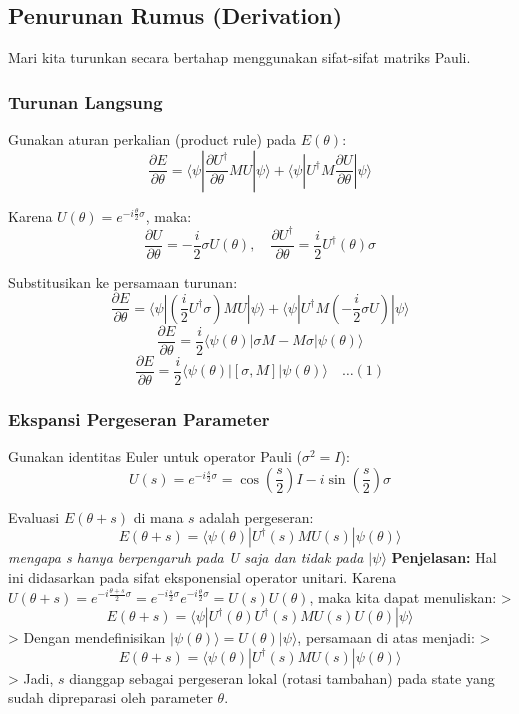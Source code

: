 \hypertarget{penurunan-rumus-derivation}{%
\subsection{Penurunan Rumus (Derivation)}\label{penurunan-rumus-derivation}}

Mari kita turunkan secara bertahap menggunakan sifat-sifat matriks Pauli.

\hypertarget{a.-turunan-langsung}{%
\subsubsection{Turunan Langsung}\label{a.-turunan-langsung}}

Gunakan aturan perkalian (product rule) pada \(E(\theta)\): \[\frac{\partial E}{\partial \theta} = \langle \psi | \frac{\partial U^\dagger}{\partial \theta} M U | \psi \rangle + \langle \psi | U^\dagger M \frac{\partial U}{\partial \theta} | \psi \rangle\]

Karena \(U(\theta) = e^{-i\frac{\theta}{2}\sigma}\), maka: \[\frac{\partial U}{\partial \theta} = -\frac{i}{2}\sigma U(\theta), \quad \frac{\partial U^\dagger}{\partial \theta} = \frac{i}{2} U^\dagger(\theta) \sigma\]

Substitusikan ke persamaan turunan: \[\frac{\partial E}{\partial \theta} = \langle \psi | \left(\frac{i}{2} U^\dagger \sigma\right) M U | \psi \rangle + \langle \psi | U^\dagger M \left(-\frac{i}{2} \sigma U\right) | \psi \rangle\] \[\frac{\partial E}{\partial \theta} = \frac{i}{2} \langle \psi(\theta) | \sigma M - M \sigma | \psi(\theta) \rangle\] \[\frac{\partial E}{\partial \theta} = \frac{i}{2} \langle \psi(\theta) | [\sigma, M] | \psi(\theta) \rangle \quad \dots (1)\]

\hypertarget{b.-ekspansi-pergeseran-parameter}{%
\subsubsection{Ekspansi Pergeseran Parameter}\label{b.-ekspansi-pergeseran-parameter}}

Gunakan identitas Euler untuk operator Pauli (\(\sigma^2 = I\)): \[U(s) = e^{-i\frac{s}{2}\sigma} = \cos\left(\frac{s}{2}\right) I - i \sin\left(\frac{s}{2}\right) \sigma\]

Evaluasi \(E(\theta + s)\) di mana \(s\) adalah pergeseran: \[E(\theta + s) = \langle \psi(\theta) | U^\dagger(s) M U(s) | \psi(\theta) \rangle\] \textit{mengapa s hanya berpengaruh pada U saja dan tidak pada $|\psi\rangle$} \textbf{Penjelasan:} Hal ini didasarkan pada sifat eksponensial operator unitari. Karena \(U(\theta + s) = e^{-i\frac{\theta+s}{2}\sigma} = e^{-i\frac{s}{2}\sigma} e^{-i\frac{\theta}{2}\sigma} = U(s)U(\theta)\), maka kita dapat menuliskan: \textgreater{} \[E(\theta + s) = \langle \psi | U^\dagger(\theta) U^\dagger(s) M U(s) U(\theta) | \psi \rangle\] \textgreater{} Dengan mendefinisikan \(|\psi(\theta)\rangle = U(\theta)|\psi\rangle\), persamaan di atas menjadi: \textgreater{} \[E(\theta + s) = \langle \psi(\theta) | U^\dagger(s) M U(s) | \psi(\theta) \rangle\] \textgreater{} Jadi, \(s\) dianggap sebagai pergeseran lokal (rotasi tambahan) pada state yang sudah dipreparasi oleh parameter \(\theta\).

